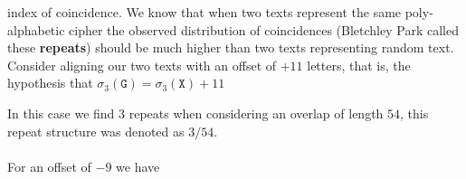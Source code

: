   index of coincidence. We know that when two texts represent the
  same poly-alphabetic cipher the observed distribution of coincidences
  (Bletchley Park called these {\bf{repeats}}) should be much higher
  than two texts representing random text. Consider aligning our two
  texts with an offset of $+11$ letters, that is, the hypothesis that
  $\sigma_3(\texttt{G}) = \sigma_3(\texttt{X}) + 11$
  \begin{center}
  \end{center}
  In this case we find $3$ repeats when considering an overlap of
  length $54$, this repeat structure was denoted as $3/54$.
  \\\\For an offset of $-9$ we have
  \begin{center}
  \end{center}
